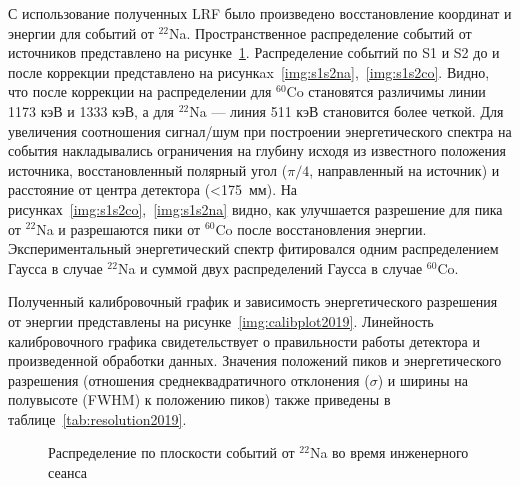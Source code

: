 С использование полученных LRF было произведено восстановление координат и энергии для событий от $^{22}$Na. Пространственное распределение событий от источников представлено на рисунке~\ref{img:xyplot2019}.
Распределение событий по S1 и S2 до и после коррекции представлено на рисункax~\ref{img:s1s2na},~\ref{img:s1s2co}. Видно, что после коррекции на распределении для $^{60}$Co становятся различимы линии 1173 кэВ и 1333 кэВ, а для $^{22}$Na --- линия 511 кэВ становится более четкой. Для увеличения соотношения сигнал/шум при построении энергетического спектра на события накладывались ограничения на глубину исходя из известного положения источника, восстановленный полярный угол ($\pi/4$, направленный на источник) и расстояние от центра детектора (<175~мм). На рисунках~\ref{img:s1s2co},~\ref{img:s1s2na} видно, как улучшается разрешение для пика от $^{22}$Na и разрешаются пики от $^{60}$Co после восстановления энергии. Экспериментальный энергетический спектр фитировался одним распределением Гаусса в случае $^{22}$Na и суммой двух распределений Гаусса в случае $^{60}$Co.

Полученный калибровочный график и зависимость энергетического разрешения от энергии представлены на рисунке~\ref{img:calibplot2019}. Линейность калибровочного графика свидетельствует о правильности работы детектора и произведенной обработки данных. Значения положений пиков и энергетического разрешения (отношения среднеквадратичного отклонения ($\sigma$) и ширины на полувысоте (FWHM) к положению пиков) также приведены в таблице~\ref{tab:resolution2019}. 

\begin{figure}[H]
	\caption{Распределение по плоскости событий от $^{22}$Na во время инженерного сеанса}
	\label{img:xyplot2019}
\end{figure}

